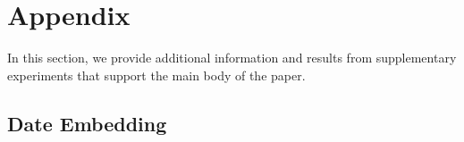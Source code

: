 \documentclass{article}
\begin{document}
\newpage







\newpage

\appendix

\section{Appendix}\label{appendix_a}





In this section, we provide additional information and results from supplementary experiments that support the main body of the paper. 

\subsection{Date Embedding}\label{date_embedding}
\end{document}
